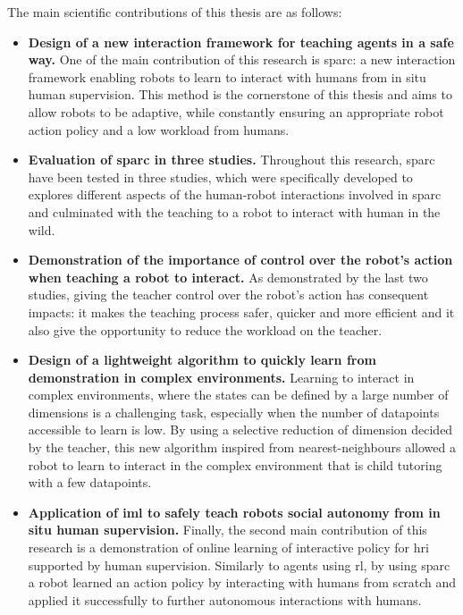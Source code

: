 The main scientific contributions of this thesis are as follows:
\begin{itemize}
	\item \textbf{Design of a new interaction framework for teaching agents in a safe way.} One of the main contribution of this research is \gls{sparc}: a new interaction framework enabling robots to learn to interact with humans from in situ human supervision. This method is the cornerstone of this thesis and aims to allow robots to be adaptive, while constantly ensuring an appropriate robot action policy and a low workload from humans.
	
	\item \textbf{Evaluation of \gls{sparc} in three studies.} Throughout this research, \gls{sparc} have been tested in three studies, which were specifically developed to explores different aspects of the human-robot interactions involved in \gls{sparc} and culminated with the teaching to a robot to interact with human in the wild.
	
	\item \textbf{Demonstration of the importance of control over the robot's action when teaching a robot to interact.} As demonstrated by the last two studies, giving the teacher control over the robot's action has consequent impacts: it makes the teaching process safer, quicker and more efficient and it also give the opportunity to reduce the workload on the teacher.
	
	\item \textbf{Design of a lightweight algorithm to quickly learn from demonstration in complex environments.} Learning to interact in complex environments, where the states can be defined by a large number of dimensions is a challenging task, especially when the number of datapoints accessible to learn is low. By using a selective reduction of dimension decided by the teacher, this new algorithm inspired from nearest-neighbours allowed a robot to learn to interact in the complex environment that is child tutoring with a few datapoints. 
	
	\item \textbf{Application of \gls{iml} to safely teach robots social autonomy from in situ human supervision.} Finally, the second main contribution of this research is a demonstration of online learning of interactive policy for \gls{hri} supported by human supervision. Similarly to agents using \gls{rl}, by using \gls{sparc} a robot learned an action policy by interacting with humans from scratch and applied it successfully to further autonomous interactions with humans.
	
\end{itemize}


